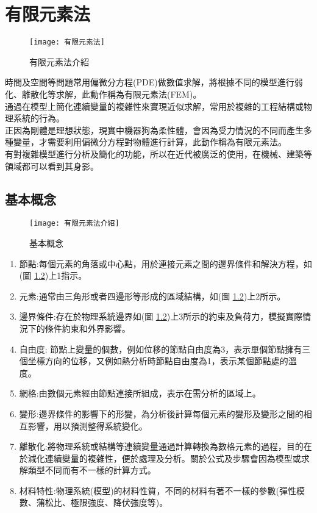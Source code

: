\chapter{有限元素法}

\begin{figure}[hbt!]
\begin{center}
\texttt{[image: 有限元素法]}
\caption{\Large 有限元素法介紹}\label{有限元素法}
\end{center}
\end{figure}
時間及空間等問題常用偏微分方程(PDE)做數值求解，將根據不同的模型進行弱化、離散化等求解，此動作稱為有限元素法(FEM)。\\

通過在模型上簡化連續變量的複雜性來實現近似求解，常用於複雜的工程結構或物理系統的行為。\\

正因為剛體是理想狀態，現實中機器狗為柔性體，會因為受力情況的不同而產生多種變量，才需要利用偏微分方程對物體進行計算，此動作稱為有限元素法。\\

有對複雜模型進行分析及簡化的功能，所以在近代被廣泛的使用，在機械、建築等領域都可以看到其身影。\\

\newpage
\section{基本概念}


\begin{figure}[hbt!]
\begin{center}
\texttt{[image: 有限元素法介紹]}
\caption{\Large 基本概念}
\label{有限元素法介紹}
\end{center}
\end{figure}

\begin{enumerate}
\item 節點:每個元素的角落或中心點，用於連接元素之間的邊界條件和解決方程，如(圖 \ref{有限元素法介紹})上1指示。
\item 元素:通常由三角形或者四邊形等形成的區域結構，如(圖 \ref{有限元素法介紹})上2所示。
\item 邊界條件:存在於物理系統邊界如(圖 \ref{有限元素法介紹})上3所示的約束及負荷力，模擬實際情況下的條件約束和外界影響。
\item 自由度: 節點上變量的個數，例如位移的節點自由度為3，表示單個節點擁有三個坐標方向的位移，又例如熱分析時節點自由度為1，表示某個節點處的溫度。
\item 網格:由數個元素經由節點連接所組成，表示在需分析的區域上。
\item 變形:邊界條件的影響下的形變，為分析後計算每個元素的變形及變形之間的相互影響，用以預測整得系統變化。
\item 離散化:將物理系統或結構等連續變量通過計算轉換為數格元素的過程，目的在於減化連續變量的複雜性，便於處理及分析。關於公式及步驟會因為模型或求解類型不同而有不一樣的計算方式。
\item 材料特性:物理系統(模型)的材料性質，不同的材料有著不一樣的參數(彈性模數、蒲松比、極限強度、降伏強度等)。\\
\end{enumerate}

